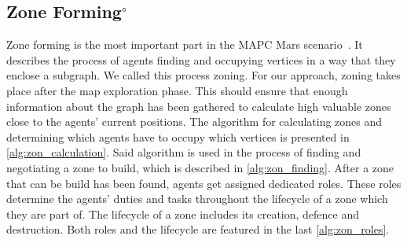 \subsection[Zone Forming]{Zone Forming$^\circ$}
Zone forming is the most important part in the MAPC Mars scenario~\cite{ahlbrecht_mapc_2014}.%
It describes the process of agents finding and occupying vertices in a way that they enclose a subgraph.
We called this process zoning.
For our approach, zoning takes place after the map exploration phase.
This should ensure that enough information about the graph has been gathered to calculate high valuable zones close to the agents' current positions.
The algorithm for calculating zones and determining which agents have to occupy which vertices is presented in \autoref{alg:zon_calculation}.
Said algorithm is used in the process of finding and negotiating a zone to build, which is described in \autoref{alg:zon_finding}.
After a zone that can be build has been found, agents get assigned dedicated roles.
These roles determine the agents' duties and tasks throughout the lifecycle of a zone which they are part of.
The lifecycle of a zone includes its creation, defence and destruction.
Both roles and the lifecycle are featured in the last \autoref{alg:zon_roles}.





